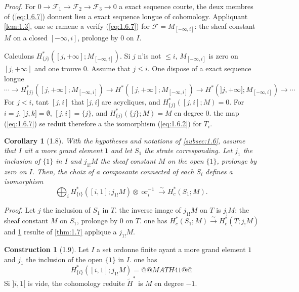 \documentclass[11pt,a4paper]{article}
\theoremstyle{plain}
\newtheorem{corollary}[theorem]{Corollary}
\theoremstyle{definition}
\newtheorem{construction}[theorem]{Construction}
\newcommand{\ori}{\operatorname{or}}
\begin{document}
\noindent\textit{Proof.} For $0 \to \mathcal{F}_1 \to \mathcal{F}_2 \to \mathcal{F}_3 \to 0$ a exact sequence courte, the deux membres of (\ref{eq:1.6.7}) donnent lieu a exact sequence longue of cohomology. Appliquant \ref{lem:1.3}, one se ramene a verify (\ref{eq:1.6.7}) for $\mathcal{F} = M_{[-\infty,i]}$: the sheaf constant $M$ on a closed $[-\infty,i]$, prolonge by $0$ on $I$.

Calculons $H^*_{\{j\}}([j,+\infty];M_{[-\infty,i]})$. Si $j$ n'is not $\leq i$, $M_{[-\infty,i]}$ is zero on $[j,+\infty]$ and one trouve $0$. Assume that $j \leq i$. One dispose of a exact sequence longue
\[\cdots \to H^*_{\{j\}}([j,+\infty];M_{[-\infty,i]}) \to H^*([j,+\infty];M_{[-\infty,i]}) \to H^*(]j,+\infty];M_{[-\infty,i]}) \to \cdots\]
For $j < i$, tant $[j,i]$ that $]j,i]$ are acycliques, and $H^*_{\{j\}}([j,i];M) = 0$. For $i = j$, $]j,k] = \emptyset$, $[j,i] = \{j\}$, and $H^*_{\{j\}}(\{j\};M) = M$ en degree $0$. the map (\ref{eq:1.6.7}) se reduit therefore a the isomorphism (\ref{eq:1.6.2}) for $T_i$.

\begin{corollary}[1.8]\label{cor:1.8}
With the hypotheses and notations of \ref{subsec:1.6}, assume that $I$ ait a more grand element $1$ and let $S_1$ the strate corresponding. Let $j_1$ the inclusion of $\{1\}$ in $I$ and $j_{1!}M$ the sheaf constant $M$ on the open $\{1\}$, prolonge by zero on $I$. Then, the choix of a composante connected of each $S_i$ defines a isomorphism
\begin{equation}\label{eq:1.8.1}
\bigoplus_i H^*_{\{i\}}([i,1];j_{1!}M) \otimes \ori_i^{-1} \xrightarrow{\sim} H^*_c(S_1;M).
\tag{1.8.1}
\end{equation}
\end{corollary}

\noindent\textit{Proof.} Let $j$ the inclusion of $S_1$ in $T$. the inverse image of $j_{1!}M$ on $T$ is $j_!M$: the sheaf constant $M$ on $S_1$, prolonge by $0$ on $T$. one has $H^*_c(S_1;M) \xrightarrow{\sim} H^*_c(T;j_!M)$ and \ref{cor:1.8} resulte of \ref{thm:1.7} applique a $j_{1!}M$.

\begin{construction}[1.9]\label{constr:1.9}
Let $I$ a set ordonne finite ayant a more grand element $1$ and $j_1$ the inclusion of the open $\{1\}$ in $I$. one has
\[
H^*_{\{i\}}([i,1];j_{1!}M) = @@MATH41@@
\]
Si $]i,1[$ is vide, the cohomology reduite $\widetilde{H}^*$ is $M$ en degree $-1$.
\end{construction}
\end{document}
